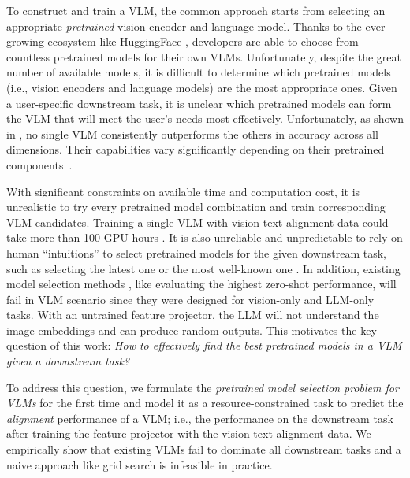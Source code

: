 To construct and train a VLM, the common approach starts from selecting an appropriate \textit{pretrained} vision encoder and language model. Thanks to the ever-growing ecosystem like HuggingFace \cite{huggingface_models_website}, developers are able to choose from countless pretrained models for their own VLMs. Unfortunately, despite the great number of available models, it is difficult to determine which pretrained models (i.e., vision encoders and language models) are the most appropriate ones. Given a user-specific downstream task, it is unclear which pretrained models can form the VLM that will meet the user's needs most effectively. Unfortunately, as shown in , no single VLM consistently outperforms the others in accuracy across all dimensions. Their capabilities vary significantly depending on their pretrained components~\cite{liu2023mmbench,xu2023lvlm}.

With significant constraints on available time and computation cost, it is unrealistic to try every pretrained model combination and train corresponding VLM candidates. Training a single VLM with vision-text alignment data could take more than 100 GPU hours \cite{liu2023improved,karamcheti2024prismatic}. It is also unreliable and unpredictable to rely on human ``intuitions'' to select pretrained models for the given downstream task, such as selecting the latest one or the most well-known one \cite{liu2023mmbench}. In addition, existing model selection methods \cite{brown2020language,you2021logme,lin2024selecting}, like evaluating the highest zero-shot performance, will fail in VLM scenario since they were designed for vision-only and LLM-only tasks. With an untrained feature projector, the LLM will not understand the image embeddings and can produce random outputs. This motivates the key question of this work: \textit{How to effectively find the best pretrained models in a VLM given a downstream task?}

To address this question, we formulate the \textit{pretrained model selection problem for VLMs} for the first time and model it as a resource-constrained task to predict the \textit{alignment} performance of a VLM; i.e., the performance on the downstream task after training the feature projector with the vision-text alignment data. We empirically show that existing VLMs fail to dominate all downstream tasks and a naive approach like grid search is infeasible in practice.  

